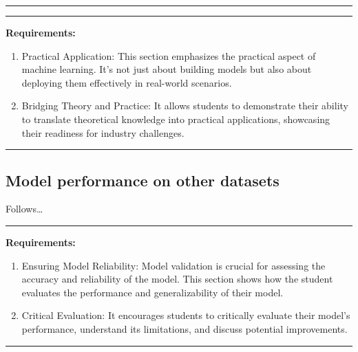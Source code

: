 \documentclass{article}
\providecommand{\tightlist}{%
  \setlength{\itemsep}{0pt}\setlength{\parskip}{0pt}}
\begin{document}
\begin{center}\rule{0.5\linewidth}{0.5pt}\end{center}

\begin{center}\rule{0.5\linewidth}{0.5pt}\end{center}

\textbf{Requirements:}

\begin{enumerate}
\def\labelenumi{\arabic{enumi}.}
\tightlist
\item
  Practical Application: This section emphasizes the practical aspect of
  machine learning. It's not just about building models but also about
  deploying them effectively in real-world scenarios.
\item
  Bridging Theory and Practice: It allows students to demonstrate their
  ability to translate theoretical knowledge into practical
  applications, showcasing their readiness for industry challenges.
\end{enumerate}

\begin{center}\rule{0.5\linewidth}{0.5pt}\end{center}

\subsection{Model performance on other
datasets}\label{model-performance-on-other-datasets}

Follows\ldots{}

\begin{center}\rule{0.5\linewidth}{0.5pt}\end{center}

\textbf{Requirements:}

\begin{enumerate}
\def\labelenumi{\arabic{enumi}.}
\tightlist
\item
  Ensuring Model Reliability: Model validation is crucial for assessing
  the accuracy and reliability of the model. This section shows how the
  student evaluates the performance and generalizability of their model.
\item
  Critical Evaluation: It encourages students to critically evaluate
  their model's performance, understand its limitations, and discuss
  potential improvements.
\end{enumerate}

\begin{center}\rule{0.5\linewidth}{0.5pt}\end{center}
\end{document}
